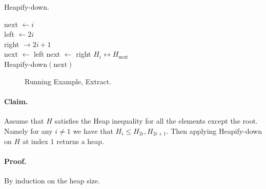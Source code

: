 \begin{algbox}{Heapify-down.}
\begin{algorithm}[H]
next  $\leftarrow i  $ \\
left  $\leftarrow 2i $ \\
right $\rightarrow 2i +1 $ \\ 
 {
  next $\leftarrow$ left 
}
 {
  next $\leftarrow$  right
}
 {
  $ H_{i} \leftrightarrow H_{\text{next}} $ \\ 
  Heapify-down$\left( \text{next}  \right)$
}
\end{algorithm}
\end{algbox}

 

\begin{figure}[h]
  \centering
  \begin{subfigure}[b]{0.23\textwidth}
	
  \end{subfigure}
\begin{subfigure}[b]{0.23\textwidth}
	
  \end{subfigure}
\begin{subfigure}[b]{0.23\textwidth}
	
  \end{subfigure}
\begin{subfigure}[b]{0.23\textwidth}
	
  \end{subfigure}
  \caption{Running Example, Extract.} 
\end{figure}


\paragraph{Claim.} Assume that $H$ satisfies the Heap inequality for all the elements except the root. Namely for any $i \neq 1$ we have that $H_{i} \le H_{2i}, H_{2i+1}$. Then applying Heapify-down on $H$ at index $1$ returns a heap.  
\paragraph{Proof.} By induction on the heap size.  
 
